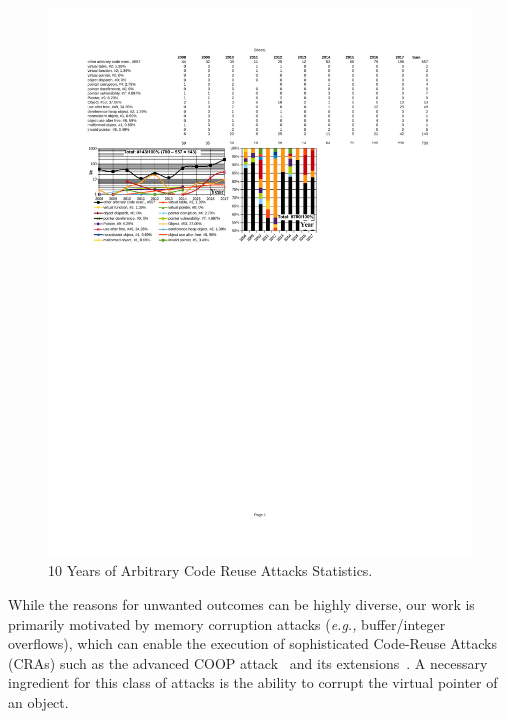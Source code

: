 \begin{figure}[t!]
\centering
\hspace{-.24cm}
  \includegraphics[scale=0.74]{figures/distri.pdf}
\vspace{-.7cm}
\caption{10 Years of Arbitrary Code Reuse Attacks Statistics.}
\label{ace:nvd:statistics}
\vspace{-.5cm}
\end{figure}

While the reasons for unwanted outcomes can be highly diverse, our work is primarily motivated by memory corruption attacks (\textit{e.g.,} buffer/integer overflows), which can enable the 
execution of sophisticated Code-Reuse Attacks (CRAs) such as the advanced COOP attack~\cite{schuster:coop} and its 
extensions~\cite{crane:readactor++, subversive-c:lettner, ctf:coop, loop:oriented}. A necessary ingredient for this class of attacks is the ability
to corrupt the virtual pointer of an object.

